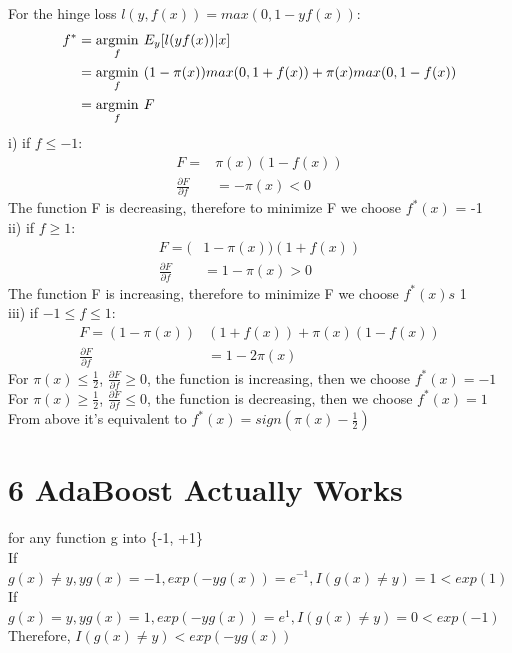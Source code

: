 \documentclass{article}
\newenvironment{problem}[2][$\bullet$]{\begin{trivlist}\large
		\item[\hskip \labelsep {\bfseries #1}\hskip \labelsep {\bfseries #2.}]}  {\end{trivlist}}
\newenvironment{sub}[2][$-$]{\begin{trivlist}
		\item[\hskip \labelsep {\bfseries #1}\hskip \labelsep {\bfseries #2.}]}  {\end{trivlist}}
\begin{document}
\begin{problem}{5.4}
\end{problem}
For the hinge loss $l(y,f(x)) = max(0,1-yf(x))$:
\begin{align}
f^* &= \underset{f}{\operatorname{arg min}} \hspace{0.05in} E_y[l(yf(x))|x]\\
&= \underset{f}{\operatorname{arg min}} \hspace{0.05in} (1- \pi(x))max(0,1+f(x)) + \pi(x)max(0,1-f(x))\\
& = \underset{f}{\operatorname{arg min}} \hspace{0.05in} F
\end{align} 
i) if $f \leq -1$:
\begin{align}
F = &\pi(x) (1-f(x)) \\
\frac{\partial F}{\partial f}&= -\pi(x) <0
\end{align} 
The function F is decreasing, therefore to minimize F we choose $f^*(x)$ = -1\\
ii) if $f \geq 1$:
\begin{align}
F = (& 1-\pi(x)) (1+f(x)) \\
\frac{\partial F}{\partial f}&= 1-\pi(x) >0
\end{align} 
The function F is increasing, therefore to minimize F we choose $f^*(x)s$ 1\\
iii) if $-1 \leq f \leq 1$:
\begin{align}
F = (1-\pi(x)) &(1+f(x)) +   \pi(x) (1-f(x))  \\
\frac{\partial F}{\partial f}&= 1-2\pi(x)
\end{align}
For $\pi(x)\leq \frac{1}{2}$, $\frac{\partial F}{\partial f} \geq 0 $, the function is increasing, then we choose $f^*(x) = -1$ \\
For $\pi(x)\geq \frac{1}{2}$, $\frac{\partial F}{\partial f} \leq 0 $, the function is decreasing, then we choose $f^*(x) = 1$ \\
From above it's equivalent to $f^*(x) = sign(\pi(x)-\frac{1}{2})$

\section{6 AdaBoost Actually Works}
\begin{problem}{Exponential Bound on the training loss}
\end{problem}
\begin{sub}{6.1}
\end{sub}
for any function g into \{-1, +1\}\\
If $g(x) \neq y, yg(x) = -1, exp(-yg(x)) = e^{-1}, I(g(x) \neq y) = 1 < exp(1)$\\
If $g(x) = y, yg(x) = 1, exp(-yg(x)) = e^{1}, I(g(x) \neq y) = 0 < exp(-1)$\\
Therefore, $ I(g(x) \neq y) < exp(-yg(x))$   \\
\end{document}

